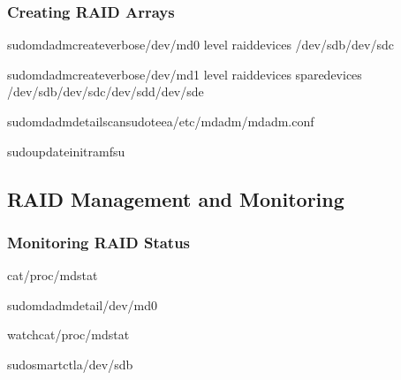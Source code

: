 \documentclass[letterpaper,10pt,english]{sphinxmanual}
\begin{document}
\subsubsection{Creating RAID Arrays}
\label{\detokenize{raid-systems:creating-raid-arrays}}
\begin{sphinxVerbatim}[commandchars=\\\{\}]
sudomdadm\PYGZhy{}\PYGZhy{}create\PYGZhy{}\PYGZhy{}verbose/dev/md0
\PYGZhy{}\PYGZhy{}level
\PYGZhy{}\PYGZhy{}raid\PYGZhy{}devices
/dev/sdb/dev/sdc

sudomdadm\PYGZhy{}\PYGZhy{}create\PYGZhy{}\PYGZhy{}verbose/dev/md1
\PYGZhy{}\PYGZhy{}level
\PYGZhy{}\PYGZhy{}raid\PYGZhy{}devices
\PYGZhy{}\PYGZhy{}spare\PYGZhy{}devices
/dev/sdb/dev/sdc/dev/sdd/dev/sde

sudomdadm\PYGZhy{}\PYGZhy{}detail\PYGZhy{}\PYGZhy{}scansudotee\PYGZhy{}a/etc/mdadm/mdadm.conf

sudoupdate\PYGZhy{}initramfs\PYGZhy{}u
\end{sphinxVerbatim}


\subsection{RAID Management and Monitoring}
\label{\detokenize{raid-systems:raid-management-and-monitoring}}

\subsubsection{Monitoring RAID Status}
\label{\detokenize{raid-systems:monitoring-raid-status}}
\begin{sphinxVerbatim}[commandchars=\\\{\}]
cat/proc/mdstat

sudomdadm\PYGZhy{}\PYGZhy{}detail/dev/md0

watchcat/proc/mdstat

sudosmartctl\PYGZhy{}a/dev/sdb
\end{sphinxVerbatim}
\end{document}
